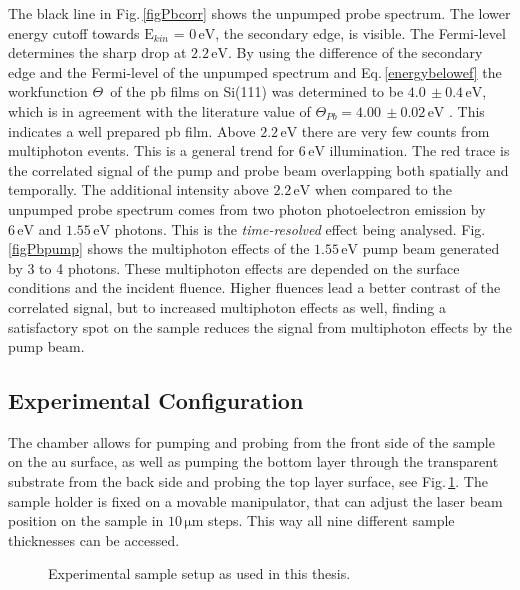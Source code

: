 \documentclass[a4paper,12pt,twoside]{article}
\begin{document}
\noindent
The black line in Fig.\,\ref{figPbcorr} shows the unpumped probe spectrum. The lower energy cutoff towards $\mathrm{E}_{kin}$ = $0\,\mathrm{eV}$, the secondary edge, is visible. The Fermi-level determines the sharp drop at $2.2\,\mathrm{eV}$. By using the difference of the secondary edge and the Fermi-level of the unpumped spectrum and Eq.\,\ref{energybelowef} the workfunction $\Theta$\, of the \gls{pb} films on Si(111) was determined to be $4.0\,\pm0.4\,\mathrm{eV}$, which is in agreement with the literature value of $\Theta_{Pb} = 4.00\,\pm0.02\,\mathrm{eV}$ \cite{PhysRev.102.367}. This indicates a well prepared \gls{pb} film. Above $2.2\,\mathrm{eV}$ there are very few counts from multiphoton events. This is a general trend for $6\,\mathrm{eV}$ illumination. The red trace is the correlated signal of the pump and probe beam overlapping both spatially and temporally. The additional intensity above $2.2\,\mathrm{eV}$ when compared to the unpumped probe spectrum comes from two photon photoelectron emission by $6\,\mathrm{eV}$ and $1.55\,\mathrm{eV}$ photons. This is the \textit{time-resolved} effect being analysed. Fig.\,\ref{figPbpump} shows the multiphoton effects of the $1.55\,\mathrm{eV}$ pump beam generated by 3 to 4 photons. These multiphoton effects are depended on the surface conditions and the incident fluence. Higher fluences lead a better contrast of the correlated signal, but to increased multiphoton effects as well, finding a satisfactory spot on the sample reduces the signal from multiphoton effects by the pump beam.

    \subsection{Experimental Configuration}
The chamber allows for pumping and probing from the front side of the sample on the \gls{au} surface, as well as pumping the bottom layer through the transparent substrate from the back side and probing the top layer surface, see Fig.\,\ref{expsetup}. The sample holder is fixed on a movable manipulator, that can adjust the laser beam position on the sample in $10\,\mathrm{\mu m}$ steps. This way all nine different sample thicknesses can be accessed.
	\begin{figure}[H]
		\caption{Experimental sample setup as used in this thesis.}
	    	\label{expsetup}
	\end{figure}
 
\end{document}
